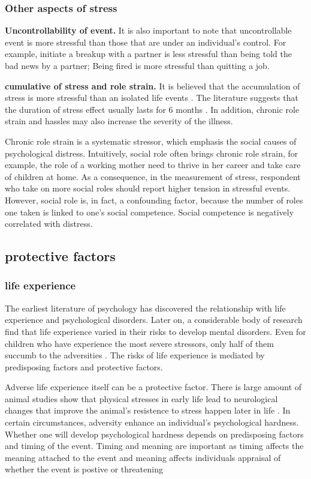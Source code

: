 \subsubsection{Other aspects of stress} 
\textbf{Uncontrollability of event.} It is also important to note that uncontrollable event is more stressful than those that are under an individual's control. For example, initiate a breakup with a partner is less stressful than being told the bad news by a partner; Being fired is more stressful than quitting a job. 


\textbf{cumulative of stress and role strain.} It is believed that the accumulation of stress is more stressful than an isolated life events \cite{evans2013childhood}. The literature suggests that the duration of stress effect usually lasts for 6 months  \cite{depue1986conceptualization,norris1987transitory}. In addition, chronic role strain and hassles may also increase the severity of the illness. 
 
Chronic role strain is a systematic stressor, which emphasis the social causes of psychological distress. Intuitively, social role often brings chronic role strain, for example, the role of a working mother need to thrive in her career and take care of children at home. As a consequence, in the measurement of stress, respondent who take on more social roles should report higher tension in stressful events. However, social role is, in fact, a confounding factor, because the number of roles one taken is linked to one's social competence. Social competence is negatively correlated with distress. 


\subsection{protective factors}
\subsubsection{life experience}
The earliest literature of psychology has discovered the relationship with life experience and psychological disorders. Later on, a considerable body of research find that life experience varied in their risks to develop mental disorders. Even for children who have experience the most severe  stressors, only half of them succumb to the adversities \cite{rutter1979protective}. The risks of life experience is mediated by predisposing factors and protective factors. 

Adverse life experience itself can be a protective factor. There is large amount of animal studies show that physical stresses in early life lead to neurological changes that improve the animal's resistence to stress happen later in life \cite{hennessy1979stress}. In certain circumstances, adversity enhance an individual's psychological hardness. Whether one will develop psychological hardness depends on predisposing factors and timing of the event. Timing and meaning are important as timing affects the meaning attached to the event and meaning affects individuals appraisal of whether the event is postive or threatening \cite{rutter1985resilience}

